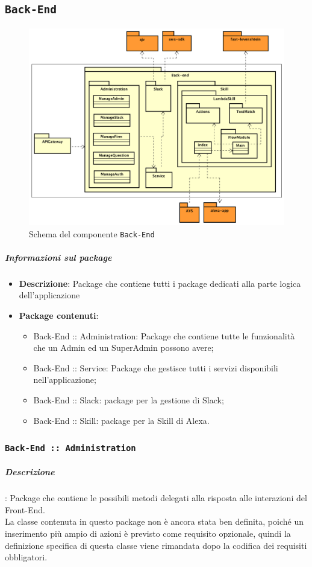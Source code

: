 \documentclass[../DefinizioneDiProdotto_v3.0.0.tex]{subfiles}
\begin{document}
\subsection{\texttt{Back-End}}
\begin{figure}[!h]
	\centering
	\includegraphics[width=\textwidth]{Architettura/Back-end.png}
	\caption{Schema del componente \texttt{Back-End}}
\end{figure}
\subparagraph{Informazioni sul package}
\begin{itemize}
	\item \textbf{Descrizione}: Package che contiene tutti i package dedicati alla parte logica dell'applicazione\item \textbf{Package contenuti}:
	      \begin{itemize}
	      	\item Back-End :: Administration: Package che contiene tutte le funzionalità che un Admin ed un SuperAdmin possono avere;
	      	\item Back-End :: Service: Package che gestisce tutti i servizi disponibili nell'applicazione;
	      	\item Back-End :: Slack: package per la gestione di Slack;
	      	\item Back-End :: Skill: package per la Skill di Alexa.
	      \end{itemize}
\end{itemize}
\subsubsection{\texttt{Back-End :: Administration}}
\subparagraph{Descrizione}: Package che contiene le possibili metodi delegati alla risposta alle interazioni del Front-End.\\
La classe contenuta in questo package non è ancora stata ben definita, poiché un inserimento più ampio di azioni è previsto come requisito opzionale, quindi la definizione specifica di questa classe viene rimandata dopo la codifica dei requisiti obbligatori.
\end{document}
